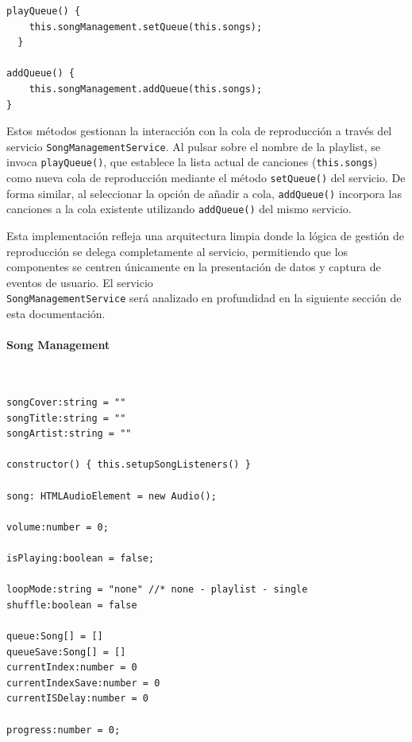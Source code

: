 \documentclass[11pt, a4paper]{article}
\begin{document}
                \begin{lstlisting}[caption={playQueue() y addQueue()}]
playQueue() {
    this.songManagement.setQueue(this.songs);
  }

addQueue() {
    this.songManagement.addQueue(this.songs);
}
                \end{lstlisting}

                Estos métodos gestionan la interacción con la cola de reproducción a través del servicio \verb|SongManagementService|. Al pulsar sobre el nombre de la playlist, se invoca \verb|playQueue()|, que establece la lista actual de canciones (\verb|this.songs|) como nueva cola de reproducción mediante el método \verb|setQueue()| del servicio. De forma similar, al seleccionar la opción de añadir a cola, \verb|addQueue()| incorpora las canciones a la cola existente utilizando \verb|addQueue()| del mismo servicio.

                Esta implementación refleja una arquitectura limpia donde la lógica de gestión de reproducción se delega completamente al servicio, permitiendo que los componentes se centren únicamente en la presentación de datos y captura de eventos de usuario. El servicio \\ \verb|SongManagementService| será analizado en profundidad en la siguiente sección de esta documentación.

                \paragraph{Song Management}
                ‎

                \begin{lstlisting}[caption={Atributos Song Management}]
songCover:string = ""
songTitle:string = ""
songArtist:string = ""

constructor() { this.setupSongListeners() }

song: HTMLAudioElement = new Audio();

volume:number = 0;

isPlaying:boolean = false;

loopMode:string = "none" //* none - playlist - single
shuffle:boolean = false

queue:Song[] = []
queueSave:Song[] = []
currentIndex:number = 0
currentIndexSave:number = 0
currentISDelay:number = 0

progress:number = 0;
                \end{lstlisting}
\end{document}
